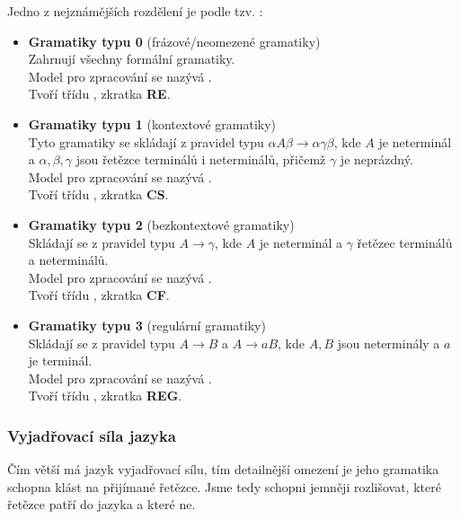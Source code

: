 \noindent
Jedno z nejznámějších rozdělení je podle tzv. :

\begin{itemize}
  \item \textbf{Gramatiky typu 0} (frázové/neomezené gramatiky)\\
  Zahrnují všechny formální gramatiky.\\
  Model pro zpracování se nazývá .\\
  Tvoří třídu , zkratka \textbf{RE}.

  \item \textbf{Gramatiky typu 1} (kontextové gramatiky)\\
  Tyto gramatiky se skládají z pravidel typu $\alpha A\beta \rightarrow \alpha \gamma \beta$,
  kde $A$ je neterminál a $\alpha, \beta, \gamma$ jsou řetězce terminálů i neterminálů,
  přičemž $\gamma$ je neprázdný.\\
  Model pro zpracování se nazývá .\\
  Tvoří třídu , zkratka \textbf{CS}.

  \item \textbf{Gramatiky typu 2} (bezkontextové gramatiky)\\
  Skládají se z pravidel typu $A \rightarrow \gamma$, kde $A$ je neterminál a
  $\gamma$ řetězec terminálů a neterminálů.\\
  Model pro zpracování se nazývá .\\
  Tvoří třídu , zkratka \textbf{CF}.

  \item \textbf{Gramatiky typu 3} (regulární gramatiky)\\
  Skládají se z pravidel typu $A \rightarrow B$ a $A \rightarrow aB$,
  kde $A, B$ jsou neterminály a $a$ je terminál.\\
  Model pro zpracování se nazývá .\\
  Tvoří třídu , zkratka \textbf{REG}.
\end{itemize}

\subsubsection*{Vyjadřovací síla jazyka}

Čím větší má jazyk vyjadřovací sílu, tím detailnější omezení je jeho
gramatika schopna klást na přijímané řetězce. Jsme tedy schopni jemněji rozlišovat,
které řetězce patří do jazyka a které ne.

